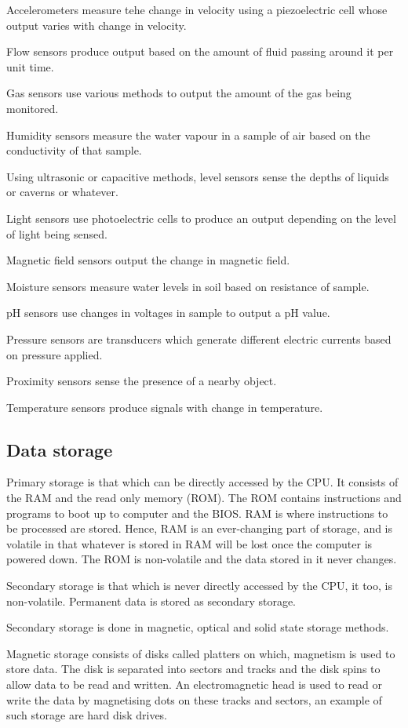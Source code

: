 Accelerometers measure tehe change in velocity using a piezoelectric cell whose output varies
with change in velocity.

Flow sensors produce output based on the amount of fluid passing around it per unit time.

Gas sensors use various methods to output the amount of the gas being monitored.

Humidity sensors measure the water vapour in a sample of air based on the conductivity of that 
sample.

Using ultrasonic or capacitive methods, level sensors sense the depths of liquids or caverns or
whatever.

Light sensors use photoelectric cells to produce an output depending on the level of light being
sensed.

Magnetic field sensors output the change in magnetic field.

Moisture sensors measure water levels in soil based on resistance of sample.

pH sensors use changes in voltages in sample to output a pH value.

Pressure sensors are transducers which generate different electric currents based on pressure
applied.

Proximity sensors sense the presence of a nearby object.

Temperature sensors produce signals with change in temperature.

\subsection{Data storage}

Primary storage is that which can be directly accessed by the CPU. It consists of the RAM and the
read only memory (ROM). The ROM contains instructions and programs to boot up to computer and the
BIOS. RAM is where instructions to be processed are stored. Hence, RAM is an ever-changing part
of storage, and is volatile in that whatever is stored in RAM will be lost once the computer is
powered down. The ROM is non-volatile and the data stored in it never changes.

Secondary storage is that which is never directly accessed by the CPU, it too, is non-volatile.
Permanent data is stored as secondary storage.

Secondary storage is done in magnetic, optical and solid state storage methods.

Magnetic storage consists of disks called platters on which, magnetism is used to store data. The
disk is separated into sectors and tracks and the disk spins to allow data to be read and written.
An electromagnetic head is used to read or write the data by magnetising dots on these tracks
and sectors, an example of such storage are hard disk drives.

